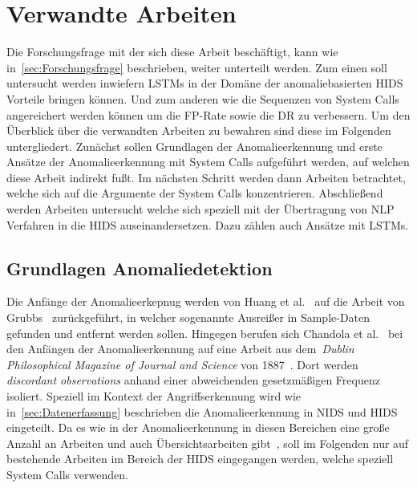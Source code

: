 \chapter{Verwandte Arbeiten}\label{ch:verwandte_arbeiten}

Die Forschungsfrage mit der sich diese Arbeit beschäftigt, kann wie in~\autoref{sec:Forschungsfrage} beschrieben, weiter unterteilt werden.
Zum einen soll untersucht werden inwiefern \acp{LSTM} in der Domäne der anomaliebasierten \ac{HIDS} Vorteile bringen können.
Und zum anderen wie die Sequenzen von System Calls angereichert werden können um die \ac{FP}-Rate sowie die \ac{DR} zu verbessern.
Um den Überblick über die verwandten Arbeiten zu bewahren sind diese im Folgenden untergliedert.
Zunächst sollen Grundlagen der Anomalieerkennung und erste Ansätze der Anomalieerkennung mit System Calls aufgeführt werden, auf welchen diese Arbeit indirekt fußt.
Im nächsten Schritt werden dann Arbeiten betrachtet, welche sich auf die Argumente der System Calls konzentrieren.
Abschließend werden Arbeiten untersucht welche sich speziell mit der Übertragung von \ac{NLP} Verfahren in die \ac{HIDS} auseinandersetzen.
Dazu zählen auch Ansätze mit \acp{LSTM}.

\section{Grundlagen Anomaliedetektion}

    Die Anfänge der Anomalieerkepnug werden von Huang et al.~\cite{ANOMALYBOOKKISHAN2017} auf die Arbeit von Grubbs~\cite{ANOMALYDEFINITION1969} zurückgeführt, in welcher sogenannte Ausreißer in Sample-Daten gefunden und entfernt werden sollen.
    Hingegen berufen sich Chandola et al.~\cite{ANOMALYSURVEY} bei den Anfängen der Anomalieerkennung auf eine Arbeit aus dem~\textit{Dublin Philosophical Magazine of Journal and Science} von 1887~\cite{ANOMALYDEFINITION1887}.
    Dort werden \textit{discordant observations} anhand einer abweichenden gesetzmäßigen Frequenz isoliert. 
    Speziell im Kontext der Angriffserkennung wird wie in~\autoref{sec:Datenerfassung} beschrieben die Anomalieerkennung in \ac{NIDS} und \ac{HIDS} eingeteilt.
    Da es wie in der Anomalieerkennung in diesen Bereichen eine große Anzahl an Arbeiten und auch Übersichtsarbeiten gibt~\cite{ANOMALYSURVEY, ANOMALYSURVEY2, ANOMALYSURVEY3}, soll im Folgenden nur auf bestehende Arbeiten im Bereich der \ac{HIDS} eingegangen werden, welche speziell System Calls verwenden.

